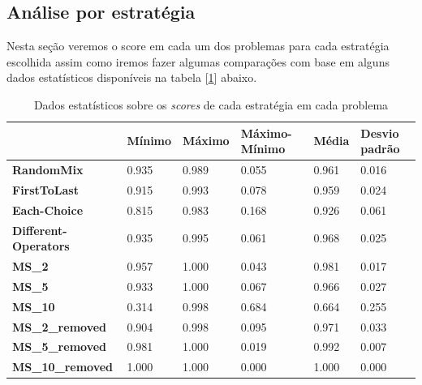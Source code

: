 \subsection{Análise por estratégia}
Nesta seção veremos o score em cada um dos problemas para cada estratégia escolhida assim como iremos fazer algumas comparações com base em alguns dados estatísticos disponíveis na tabela [\ref{tab:stats}] abaixo.
\begin{table}[ht]
\centering
\caption{Dados estatísticos sobre os \textit{scores} de cada estratégia em cada problema}
\label{tab:stats}
\begin{tabular}{|l|l|l|l|l|l|}
\hline
                             & \textbf{Mínimo} & \textbf{Máximo} & \textbf{Máximo-Mínimo} & \textbf{Média} & \textbf{Desvio padrão} \\ \hline
\textbf{RandomMix}           & 0.935           & 0.989           & 0.055                  & 0.961          & 0.016                  \\ \hline
\textbf{FirstToLast}         & 0.915           & 0.993           & 0.078                  & 0.959          & 0.024                  \\ \hline
\textbf{Each-Choice}         & 0.815           & 0.983           & 0.168                  & 0.926          & 0.061                  \\ \hline
\textbf{Different-Operators} & 0.935           & 0.995           & 0.061                  & 0.968          & 0.025                  \\ \hline
\textbf{MS\_2}               & 0.957           & 1.000           & 0.043                  & 0.981          & 0.017                  \\ \hline
\textbf{MS\_5}               & 0.933           & 1.000           & 0.067                  & 0.966          & 0.027                  \\ \hline
\textbf{MS\_10}              & 0.314           & 0.998           & 0.684                  & 0.664          & 0.255                  \\ \hline
\textbf{MS\_2\_removed}      & 0.904           & 0.998           & 0.095                  & 0.971          & 0.033                  \\ \hline
\textbf{MS\_5\_removed}      & 0.981           & 1.000           & 0.019                  & 0.992          & 0.007                  \\ \hline
\textbf{MS\_10\_removed}     & 1.000           & 1.000           & 0.000                  & 1.000          & 0.000                  \\ \hline
\end{tabular}
\end{table}

